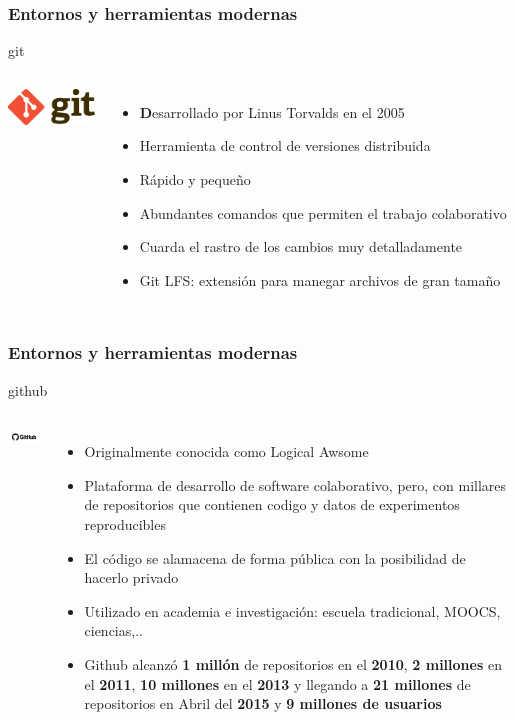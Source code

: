 \documentclass[sans serif,9pt,xcolor=dvipsnames]{beamer}%
\begin{document}
\begin{frame}
\frametitle {Entornos y herramientas modernas}
\justifying
\begin{block}{git}
\begin{columns}
 \hspace{0.7cm}
\includegraphics[width=2.3cm]{imagenes/git.png} 
\begin{itemize}
\justifying
\item \textbf Desarrollado por Linus Torvalds en el 2005 
\item Herramienta de control de versiones distribuida
\item Rápido y pequeño
\item Abundantes comandos que permiten el trabajo colaborativo 
\item Cuarda el rastro de los cambios muy detalladamente
\item Git LFS: extensión para manegar archivos de gran tamaño 
\end{itemize}
\end{columns}
\end{block}
\end{frame}

\begin{frame}
\frametitle {Entornos y herramientas modernas}
\justifying
\begin{block}{github}
\begin{columns}
 \hspace{0.7cm}
\includegraphics[width=2.3cm]{imagenes/github.png} 
\begin{itemize}
\justifying
\item Originalmente conocida como Logical Awsome
\item Plataforma de desarrollo de software colaborativo, pero, con millares de repositorios que contienen codigo y datos de experimentos reproducibles
\item El código se alamacena de forma pública con la posibilidad de hacerlo privado
\item Utilizado en academia e investigación: escuela tradicional, MOOCS, ciencias,..
\item Github alcanzó \textbf{1 millón} de repositorios en el \textbf{2010}, \textbf{2 millones} en el \textbf{2011}, \textbf{10 millones} en el \textbf{2013} y llegando a \textbf{21 millones} de repositorios en Abril del \textbf{2015} y \textbf{9 millones de usuarios}
\end{itemize}
\end{columns}
\end{block}
\end{frame}
\end{document}
